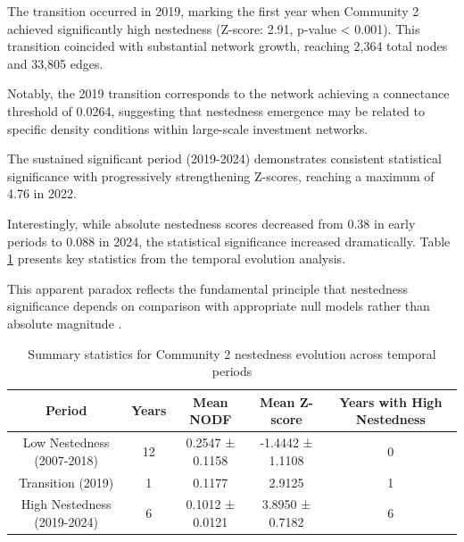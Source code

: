 The transition occurred in 2019, marking the first year when Community 2 achieved significantly high nestedness (Z-score: 2.91, p-value < 0.001). This transition coincided with substantial network growth, reaching 2,364 total nodes and 33,805 edges. 

Notably, the 2019 transition corresponds to the network achieving a connectance threshold of 0.0264, suggesting that nestedness emergence may be related to specific density conditions within large-scale investment networks.

The sustained significant period (2019-2024) demonstrates consistent statistical significance with progressively strengthening Z-scores, reaching a maximum of 4.76 in 2022. 

Interestingly, while absolute nestedness scores decreased from 0.38 in early periods to 0.088 in 2024, the statistical significance increased dramatically. Table \ref{tab:nestedness_evolution_summary} presents key statistics from the temporal evolution analysis.

This apparent paradox reflects the fundamental principle that nestedness significance depends on comparison with appropriate null models rather than absolute magnitude \cite{Mariani2019}.

\begin{table}[htbp]
\hspace*{-1cm}\centering
\begin{tabular}{|c|c|c|c|c|}
\hline
\textbf{Period} & \textbf{Years} & \textbf{Mean NODF} & \textbf{Mean Z-score} & \textbf{Years with High Nestedness} \\
\hline
Low Nestedness (2007-2018) & 12 & 0.2547 ± 0.1158 & -1.4442 ± 1.1108 & 0 \\
Transition (2019) & 1 & 0.1177 & 2.9125 & 1 \\
High Nestedness (2019-2024) & 6 & 0.1012 ± 0.0121 & 3.8950 ± 0.7182 & 6 \\
\hline
\end{tabular}
\caption{Summary statistics for Community 2 nestedness evolution across temporal periods}
\label{tab:nestedness_evolution_summary}
\end{table}

